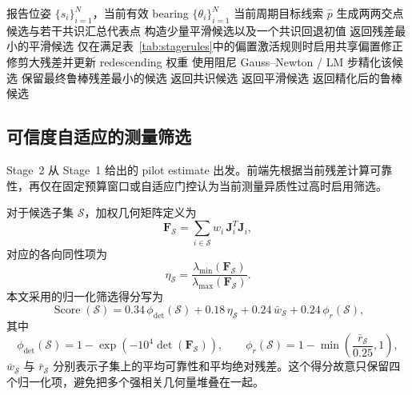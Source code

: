 \documentclass[drones,article,submit,moreauthors]{Definitions/mdpi}
\begin{document}
\begin{algorithm}[!htbp]
\caption{共识辅助鲁棒融合}
\label{alg:frontend}
\begin{algorithmic}
\Require 报告位姿 $\{s_i\}_{i=1}^N$，当前有效 bearing $\{\theta_i\}_{i=1}^N$
\Ensure 当前周期目标线索 $\hat{p}$
\State 生成两两交点候选与若干共识汇总代表点
\State 构造少量平滑候选以及一个共识回退初值
    \State 返回残差最小的平滑候选
\EndIf
{}
    \State 仅在满足表~\ref{tab:stagerules}中的偏置激活规则时启用共享偏置修正
    \State 修剪大残差并更新 redescending 权重
    \State 使用阻尼 Gauss--Newton / LM 步精化该候选
\EndFor
\State 保留最终鲁棒残差最小的候选
    \State 返回共识候选
    \State 返回平滑候选
\Else
    \State 返回精化后的鲁棒候选
\EndIf
\end{algorithmic}
\end{algorithm}



\subsection{可信度自适应的测量筛选}

Stage~2 从 Stage~1 给出的 pilot estimate 出发。前端先根据当前残差计算可靠性，再仅在固定预算窗口或自适应门控认为当前测量异质性过高时启用筛选。

对于候选子集 $\mathcal{S}$，加权几何矩阵定义为
\begin{equation}
\mathbf{F}_{\mathcal{S}}=\sum_{i\in\mathcal{S}} w_i\,\mathbf{J}_i^T\mathbf{J}_i,
\end{equation}
对应的各向同性项为
\begin{equation}
\eta_{\mathcal{S}}=\frac{\lambda_{\min}(\mathbf{F}_{\mathcal{S}})}{\lambda_{\max}(\mathbf{F}_{\mathcal{S}})}.
\end{equation}
本文采用的归一化筛选得分写为
\begin{equation}
\operatorname{Score}(\mathcal{S})=
0.34\,\phi_{\det}(\mathcal{S})
+0.18\,\eta_{\mathcal{S}}
+0.24\,\bar{w}_{\mathcal{S}}
+0.24\,\phi_{r}(\mathcal{S}),
\end{equation}
其中
\begin{equation}
\phi_{\det}(\mathcal{S}) = 1-\exp\!\left(-10^4\det(\mathbf{F}_{\mathcal{S}})\right),
\qquad
\phi_r(\mathcal{S}) = 1-\min\!\left(\frac{\bar{r}_{\mathcal{S}}}{0.25},1\right),
\end{equation}
$\bar{w}_{\mathcal{S}}$ 与 $\bar{r}_{\mathcal{S}}$ 分别表示子集上的平均可靠性和平均绝对残差。这个得分故意只保留四个归一化项，避免把多个强相关几何量堆叠在一起。
\end{document}
